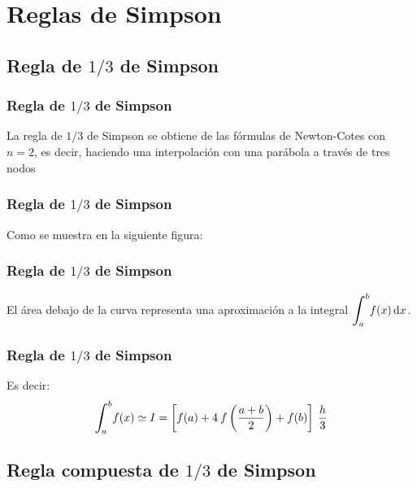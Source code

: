 \documentclass[12pt]{beamer}
\begin{document}
\section{Reglas de Simpson}
\subsection{Regla de \texorpdfstring{$1/3$}{1/3} de Simpson}

\begin{frame}
\frametitle{Regla de $1/3$ de Simpson}
La regla de $1/3$ de Simpson se obtiene de las fórmulas de Newton-Cotes con $n = 2$, \pause es decir, haciendo una interpolación con una parábola a través de tres nodos
\end{frame}
\begin{frame}
\frametitle{Regla de $1/3$ de Simpson}
Como se muestra en la siguiente figura:
\begin{figure}
	\centering
	
\end{figure}
\end{frame}
\begin{frame}
\frametitle{Regla de $1/3$ de Simpson}
\begin{figure}
	\centering
	
\end{figure}
El área debajo de la curva representa una aproximación a la integral $\scaleint{6ex}_{\bs a}^{b} f (x) \dd{x}$.
\end{frame}
\begin{frame}
\frametitle{Regla de $1/3$ de Simpson}
Es decir:
\begin{align*}
\scaleint{6ex}_{\bs a}^{b} f (x) \simeq I = \left[ f (a) + 4 \: f \left( \dfrac{a + b}{2} \right) + f (b) \right] \: \dfrac{h}{3}
\end{align*}
\end{frame}

\subsection{Regla compuesta de \texorpdfstring{$1/3$}{1/3} de Simpson}
\end{document}
